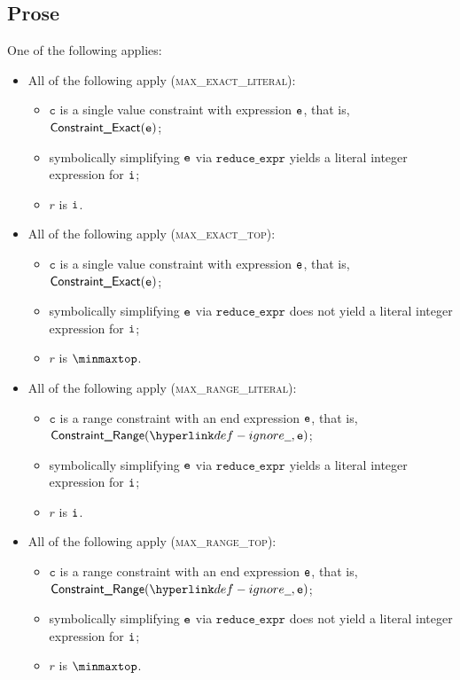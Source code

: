 \documentclass{book}
\newcommand\reduceexpr[0]{\texttt{reduce\_expr}}
\newcommand\vc[0]{\texttt{c}}
\begin{document}
\subsection{Prose}
One of the following applies:
\begin{itemize}
  \item All of the following apply (\textsc{max\_exact\_literal}):
  \begin{itemize}
    \item $\vc$ is a single value constraint with expression $\texttt{e}$, that is, $\textsf{Constraint\_Exact}(\texttt{e})$;
    \item symbolically simplifying $\texttt{e}$ via $\reduceexpr$ yields a literal integer expression for $\texttt{i}$;
    \item $r$ is $\texttt{i}$.
  \end{itemize}

  \item All of the following apply (\textsc{max\_exact\_top}):
  \begin{itemize}
    \item $\vc$ is a single value constraint with expression $\texttt{e}$, that is, $\textsf{Constraint\_Exact}(\texttt{e})$;
    \item symbolically simplifying $\texttt{e}$ via $\reduceexpr$ does not yield a literal integer expression for $\texttt{i}$;
    \item $r$ is $\minmaxtop$.
  \end{itemize}

  \item All of the following apply (\textsc{max\_range\_literal}):
  \begin{itemize}
    \item $\vc$ is a range constraint with an end expression $\texttt{e}$, that is, $\ConstraintRange(\Ignore, \ve)$;
    \item symbolically simplifying $\texttt{e}$ via $\reduceexpr$ yields a literal integer expression for $\texttt{i}$;
    \item $r$ is $\texttt{i}$.
  \end{itemize}

  \item All of the following apply (\textsc{max\_range\_top}):
  \begin{itemize}
    \item $\vc$ is a range constraint with an end expression $\texttt{e}$, that is, $\ConstraintRange(\Ignore, \ve)$;
    \item symbolically simplifying $\texttt{e}$ via $\reduceexpr$ does not yield a literal integer expression for $\texttt{i}$;
    \item $r$ is $\minmaxtop$.
  \end{itemize}
\end{itemize}
\end{document}
